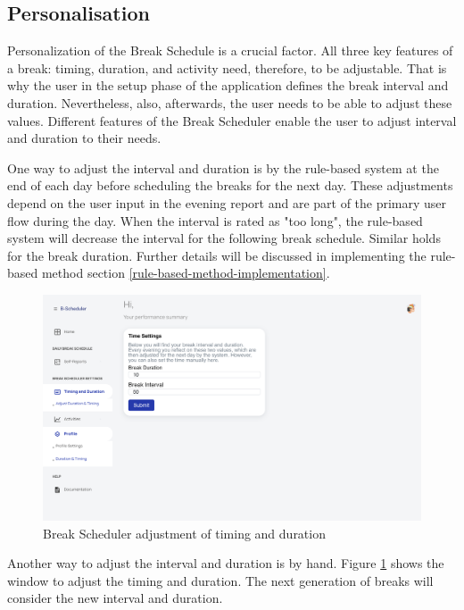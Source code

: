 \documentclass{hasel_thesis}
\begin{document}
\subsection{Personalisation} \label{personalization}
Personalization of the Break Schedule is a crucial factor. All three key features of a break: timing, duration, and activity need, therefore, to be adjustable. That is why the user in the setup phase of the application defines the break interval and duration. Nevertheless, also, afterwards, the user needs to be able to adjust these values. Different features of the Break Scheduler enable the user to adjust interval and duration to their needs.

One way to adjust the interval and duration is by the rule-based system at the end of each day before scheduling the breaks for the next day. These adjustments depend on the user input in the evening report and are part of the primary user flow during the day. When the interval is rated as "too long", the rule-based system will decrease the interval for the following break schedule. Similar holds for the break duration. Further details will be discussed in implementing the rule-based method section \ref{rule-based-method-implementation}.

\begin{figure}[htp]
    \centering
    \includegraphics[width=15cm]{hasel_thesis/images/adjust_timing.png}
    \caption{Break Scheduler adjustment of timing and duration}
    \label{fig:adjust_timing}
\end{figure}

Another way to adjust the interval and duration is by hand. Figure \ref{fig:adjust_timing} shows the window to adjust the timing and duration. The next generation of breaks will consider the new interval and duration.
\end{document}

